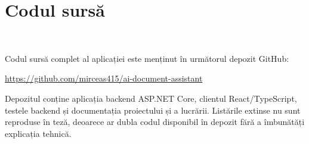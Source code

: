\chapter*{Codul sursă}
~

Codul sursă complet al aplicației este menținut în următorul depozit GitHub:

\begin{center}
\url{https://github.com/mirceas415/ai-document-assistant}
\end{center}

Depozitul conține aplicația backend ASP.NET Core, clientul React/TypeScript, testele backend și documentația proiectului și a lucrării. Listările extinse nu sunt reproduse în teză, deoarece ar dubla codul disponibil în depozit fără a îmbunătăți explicația tehnică.
